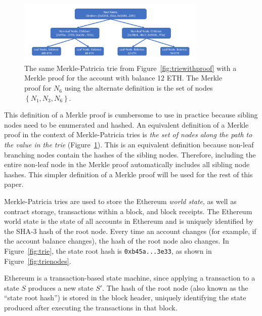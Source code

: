 \documentclass[12pt]{article}
\newcommand{\set}[1]{\left\{#1\right\}}
\newcommand{\figurewidth}{0.8\textwidth}
\begin{document}
\begin{figure}[H]
  \centering
  \includegraphics[width=\figurewidth, page=3]{../figures/background/trie/tree_with_merkle_proof.pdf}
  \caption{The same Merkle-Patricia trie from Figure~\ref{fig:triewithproof} with a Merkle proof for the account with balance 12 ETH. The Merkle proof for $N_6$ using the alternate definition is the set of nodes $\set{N_1, N_3, N_6}$. } \label{fig:triewithsimpleproof}
\end{figure}

This definition of a Merkle proof is cumbersome to use in practice because sibling nodes need to be enumerated and hashed. An equivalent definition of a Merkle proof in the context of Merkle-Patricia tries is \emph{the set of nodes along the path to the value in the trie} (Figure~\ref{fig:triewithsimpleproof}). This is an equivalent definition because non-leaf branching nodes contain the hashes of the sibling nodes. Therefore, including the entire non-leaf node in the Merkle proof automatically includes all sibling node hashes. This simpler definition of a Merkle proof will be used for the rest of this paper.


Merkle-Patricia tries are used to store the Ethereum \emph{world state}, as well as contract storage, transactions within a block, and block receipts. The Ethereum world state is the state of all accounts in Ethereum and is uniquely identified by the SHA-3 hash of the root node. Every time an account changes (for example, if the account balance changes), the hash of the root node also changes. In Figure~\ref{fig:trie}, the state root hash is \texttt{0xb45a...3e33}, as shown in Figure~\ref{fig:trienodes}.

Ethereum is a transaction-based state machine, since applying a transaction to a state $S$ produces a new state $S'$. The hash of the root node (also known as the ``state root hash'') is stored in the block header, uniquely identifying the state produced after executing the transactions in that block.

\end{document}
